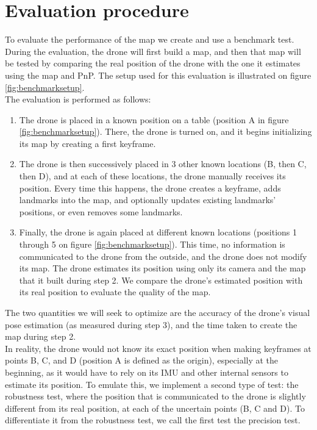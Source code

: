 \section{Evaluation procedure} \label{evalproc}
To evaluate the performance of the map we create and use a benchmark test.\\
During the evaluation, the drone will first build a map, and then that map will be tested by comparing the real position of the drone with the one it estimates using the map and PnP. The setup used for this evaluation is illustrated on figure \ref{fig:benchmarksetup}.\\
The evaluation is performed as follows:
\begin{enumerate}
  \item The drone is placed in a known position on a table (position A in figure \ref{fig:benchmarksetup}). There, the drone is turned on, and it begins initializing its map by creating a first keyframe.
  \item The drone is then successively placed in 3 other known locations (B, then C, then D), and at each of these locations, the drone manually receives its position. Every time this happens, the drone creates a keyframe, adds landmarks into the map, and optionally updates existing landmarks' positions, or even removes some landmarks.
  \item Finally, the drone is again placed at different known locations (positions 1 through 5 on figure \ref{fig:benchmarksetup}). This time, no information is communicated to the drone from the outside, and the drone does not modify its map. The drone estimates its position using only its camera and the map that it built during step 2. We compare the drone's estimated position with its real position to evaluate the quality of the map.
\end{enumerate}
The two quantities we will seek to optimize are the accuracy of the drone's visual pose estimation (as measured during step 3), and the time taken to create the map during step 2.\\
In reality, the drone would not know its exact position when making keyframes at points B, C, and D (position A is defined as the origin), especially at the beginning, as it would have to rely on its IMU and other internal sensors to estimate its position. To emulate this, we implement a second type of test: the robustness test, where the position that is communicated to the drone is slightly different from its real position, at each of the uncertain points (B, C and D). To differentiate it from the robustness test, we call the first test the precision test.\\

